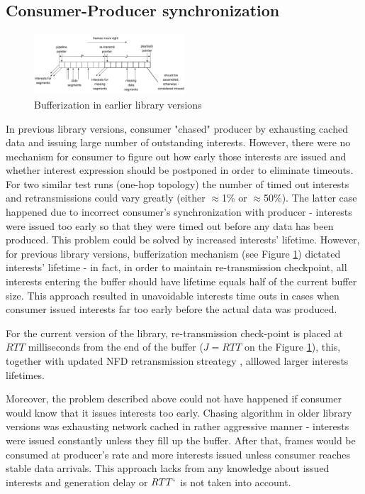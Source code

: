\documentclass{icn/sig-alternate-2012} %
\begin{document}
\subsection{Consumer-Producer synchronization}

\begin{figure}[t!]
\centering
\includegraphics[width=0.5\textwidth]{buffer}
\caption{Bufferization in earlier library versions}
\label{fig:old-buf}
\end{figure}

In previous library versions, consumer "chased" producer by exhausting cached data and issuing large number of outstanding interests. However, there were no mechanism for consumer to figure out how early those interests are issued and whether interest expression should be postponed in order to eliminate timeouts. For two similar test runs (one-hop topology) the number of timed out interests and retransmissions could vary greatly (either $\approx$1\% or $\approx$50\%). The latter case happened due to incorrect consumer's synchronization with producer - interests were issued too early so that they were timed out before any data has been produced. This problem could be solved by increased interests' lifetime. However, for previous library versions, bufferization mechanism (see Figure \ref{fig:old-buf}) dictated interests' lifetime - in fact, in order to maintain re-transmission checkpoint, all interests entering the buffer should have lifetime equals half of the current buffer size. This approach resulted in unavoidable interests time outs in cases when consumer issued interests far too early before the actual data was produced.

For the current version of the library, re-transmission check-point is placed at $RTT$ milliseconds from the end of the buffer ($J=RTT$ on the Figure \ref{fig:old-buf}), this, together with updated NFD retransmission streategy \cite{nfd-rtx}, alllowed larger interests lifetimes.

Moreover, the problem described above could not have happened if consumer would know that it issues interests too early. Chasing algorithm in older library versions was exhausting network cached in rather aggressive manner - interests were issued constantly unless they fill up the buffer. After that, frames would be consumed at producer's rate and more interests issued unless consumer reaches stable data arrivals. This approach lacks from any knowledge about issued interests and generation delay or $RTT`$ is not taken into account.
\end{document}
